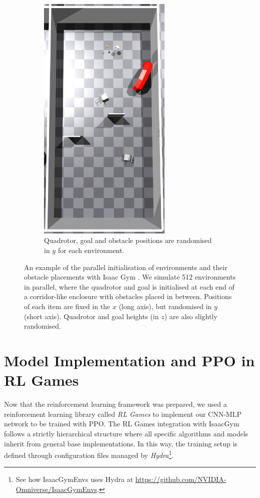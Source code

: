 \begin{figure}[hbt]
\begin{subfigure}[b]{0.3\textwidth}
        \includegraphics[width=0.7\textwidth]{figures/6_/6_n_obst_env.png}
        \caption{Quadrotor, goal and obstacle positions are randomised in $y$ for each environment.}
        \label{fig:6_n_obst_env}
    \end{subfigure}
    \caption{An example of the parallel initialisation of environments and their obstacle placements with Isaac Gym \cite{IsaacGym}. We simulate 512 environments in parallel, where the quadrotor and goal is initialised at each end of a corridor-like enclosure with obstacles placed in between. Positions of each item are fixed in the $x$ (long axis), but randomised in $y$ (short axis). Quadrotor and goal heights (in $z$) are also slightly randomised.}
    \label{fig:6_env_init}
\end{figure}


\section{Model Implementation and PPO in RL Games}
Now that the reinforcement learning framework was prepared, we used a reinforcement learning library called \textit{RL Games} \cite{rl-games2022} to implement our CNN-MLP network to be trained with PPO.
The RL Games integration with IsaacGym follows a strictly hierarchical structure where all specific algorithms and models inherit from general base implementations. In this way, the training setup is defined through configuration files managed by \textit{Hydra}\footnote{See how IsaacGymEnvs uses Hydra at \url{https://github.com/NVIDIA-Omniverse/IsaacGymEnvs}.}. 

